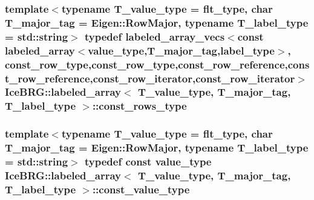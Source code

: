 \subsubsection[{const\+\_\+rows\+\_\+type}]{\setlength{\rightskip}{0pt plus 5cm}template$<$typename T\+\_\+value\+\_\+type = flt\+\_\+type, char T\+\_\+major\+\_\+tag = Eigen\+::\+Row\+Major, typename T\+\_\+label\+\_\+type = std\+::string$>$ typedef {\bf labeled\+\_\+array\+\_\+vecs}$<$const {\bf labeled\+\_\+array}$<${\bf value\+\_\+type},T\+\_\+major\+\_\+tag,{\bf label\+\_\+type}$>$, {\bf const\+\_\+row\+\_\+type},{\bf const\+\_\+row\+\_\+type},{\bf const\+\_\+row\+\_\+reference},{\bf const\+\_\+row\+\_\+reference},{\bf const\+\_\+row\+\_\+iterator},{\bf const\+\_\+row\+\_\+iterator}$>$ {\bf Ice\+B\+R\+G\+::labeled\+\_\+array}$<$ T\+\_\+value\+\_\+type, T\+\_\+major\+\_\+tag, T\+\_\+label\+\_\+type $>$\+::{\bf const\+\_\+rows\+\_\+type}}\label{classIceBRG_1_1labeled__array_a6aec05e454845b2750b446c00fd4c9fb}
\hypertarget{classIceBRG_1_1labeled__array_a4b9270762c39bd24b1f7855a7e21a63d}{}
\subsubsection[{const\+\_\+value\+\_\+type}]{\setlength{\rightskip}{0pt plus 5cm}template$<$typename T\+\_\+value\+\_\+type = flt\+\_\+type, char T\+\_\+major\+\_\+tag = Eigen\+::\+Row\+Major, typename T\+\_\+label\+\_\+type = std\+::string$>$ typedef const {\bf value\+\_\+type} {\bf Ice\+B\+R\+G\+::labeled\+\_\+array}$<$ T\+\_\+value\+\_\+type, T\+\_\+major\+\_\+tag, T\+\_\+label\+\_\+type $>$\+::{\bf const\+\_\+value\+\_\+type}}\label{classIceBRG_1_1labeled__array_a4b9270762c39bd24b1f7855a7e21a63d}
\hypertarget{classIceBRG_1_1labeled__array_a43d1c710fe591f9610ab9e9827aabba6}{}
